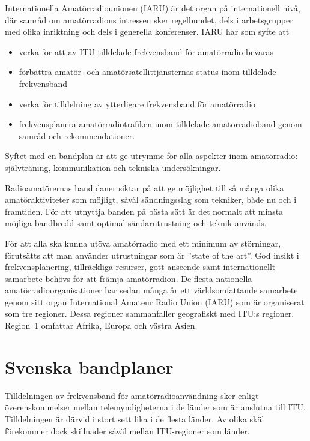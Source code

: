 Internationella Amatörradiounionen (IARU) är det organ på internationell
nivå, där samråd om amatörradions intressen sker regelbundet, dels i
arbetsgrupper med olika inriktning och dels i generella konferenser.
IARU har som syfte att

\begin{itemize}
  \item verka för att av ITU tilldelade frekvensband för amatörradio bevaras
  \item förbättra amatör- och amatörsatellittjänsternas status inom tilldelade
  frekvensband
  \item verka för tilldelning av ytterligare frekvensband för amatörradio
  \item frekvensplanera amatörradiotrafiken inom tilldelade amatörradioband
  genom samråd och rekommendationer.
\end{itemize}

Syftet med en bandplan är att ge utrymme för alla aspekter inom amatörradio:
självträning, kommunikation och tekniska undersökningar.

Radioamatörernas bandplaner siktar på att ge möjlighet till så många olika
amatöraktiviteter som möjligt, såväl sändningsslag som tekniker, både nu och i
framtiden.
För att utnyttja banden på bästa sätt är det normalt att minsta möjliga
bandbredd samt optimal sändarutrustning och teknik används.

För att alla ska kunna utöva amatörradio med ett minimum av störningar,
förutsätts att man använder utrustningar som är ''state of the art''.
God insikt i frekvensplanering, tillräckliga resurser, gott anseende samt
internationellt samarbete behövs för att främja amatörradion.
De flesta nationella amatörradioorganisationer har sedan många år ett
världsomfattande samarbete genom sitt organ International Amateur Radio Union
(IARU) som är organiserat som tre regioner.
Dessa regioner sammanfaller geografiskt med ITU:s regioner.
Region~1 omfattar Afrika, Europa och västra Asien.

\newpage %
\section{Svenska bandplaner}

Tilldelningen av frekvensband för amatörradioanvändning sker enligt
överenskommelser mellan telemyndigheterna i de länder som är anslutna till ITU.
Tilldelningen är därvid i stort sett lika i de flesta länder.
Av olika skäl förekommer dock skillnader såväl mellan ITU-regioner som länder.

